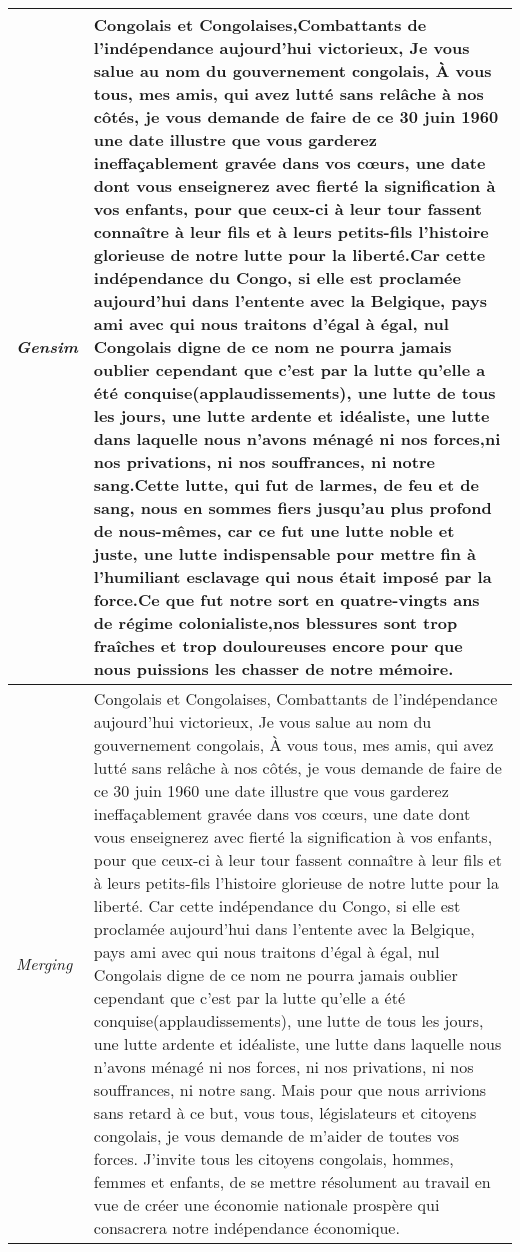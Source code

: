 \begin{center}
\begin{longtable}{|p{3cm}|p{13cm}|}
\textit{Gensim} & Congolais et Congolaises,Combattants de l'indépendance aujourd'hui victorieux, Je vous salue au nom du gouvernement congolais, À vous tous, mes amis, qui avez lutté sans relâche à nos côtés, je vous demande de faire de ce 30 juin 1960 une date illustre que vous garderez i\-ne\-ffa\-ça\-ble\-ment gravée dans vos cœurs, une date dont vous enseignerez avec fierté la signification à vos enfants, pour que ceux-ci à leur tour fassent connaître à leur fils et à leurs petits-fils l'histoire glorieuse de notre lutte pour la liberté.Car cette indépendance du Congo, si elle est proclamée aujourd'hui dans l'entente avec la Belgique, pays ami avec qui nous traitons d'égal à égal, nul Congolais digne de ce nom ne pourra jamais oublier cependant que c'est par la lutte qu'elle a été conquise(applaudissements), une lutte de tous les jours, une lutte ardente et idéaliste, une lutte dans laquelle nous n'avons ménagé ni nos forces,ni nos privations, ni nos souffrances, ni notre sang.Cette lutte, qui fut de larmes, de feu et de sang, nous en sommes fiers jusqu'au plus profond de nous-mêmes, car ce fut une lutte noble et juste, une lutte indispensable pour mettre fin à l'humiliant esclavage qui nous était imposé par la force.Ce que fut notre sort en quatre-vingts ans de régime colonialiste,nos blessures sont trop fraîches et trop douloureuses encore pour que nous puissions les chasser de notre mémoire. \\
\hline
\textit{Merging} & Congolais et Congolaises, Combattants de l'indépendance aujourd'hui victorieux, Je vous salue au nom du gouvernement congolais, À vous tous, mes amis, qui avez lutté sans relâche à nos côtés, je vous demande de faire de ce 30 juin 1960 une date illustre que vous garderez i\-ne\-ffa\-ça\-ble\-ment gravée dans vos cœurs, une date dont vous enseignerez avec fierté la signification à vos enfants, pour que ceux-ci à leur tour fassent connaître à leur fils et à leurs petits-fils l'histoire glorieuse de notre lutte pour la liberté. Car cette indépendance du Congo, si elle est proclamée aujourd'hui dans l'entente avec la Belgique, pays ami avec qui nous traitons d'égal à égal, nul Congolais digne de ce nom ne pourra jamais oublier cependant que c'est par la lutte qu'elle a été conquise(applaudissements), une lutte de tous les jours, une lutte ardente et idéaliste, une lutte dans laquelle nous n'avons ménagé ni nos forces, ni nos privations, ni nos souffrances, ni notre sang. Mais pour que nous arrivions sans retard à ce but, vous tous, législateurs et citoyens congolais, je vous demande de m'aider de toutes vos forces. J'invite tous les citoyens congolais, hommes, femmes et enfants, de se mettre résolument au travail en vue de créer une économie nationale prospère qui consacrera notre indépendance économique. \\

\end{longtable}
\end{center}
